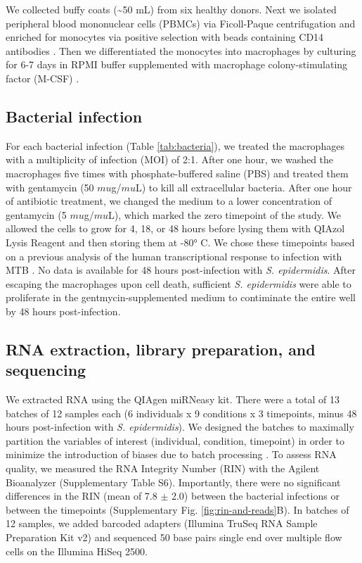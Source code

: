 We collected buffy coats (\textasciitilde{}50 mL) from six healthy
donors. Next we isolated peripheral blood mononuclear cells (PBMCs) via
Ficoll-Paque centrifugation \citep{Rivero-Lezcano2012} and enriched for
monocytes via positive selection with beads containing CD14 antibodies
\citep{Barreiro2012}. Then we differentiated the monocytes into
macrophages by culturing for 6-7 days in RPMI buffer supplemented with
macrophage colony-stimulating factor (M-CSF) \citep{Tailleux2003}.

\subsection{Bacterial infection}\label{bacterial-infection}

For each bacterial infection (Table \ref{tab:bacteria}), we treated the macrophages with
a multiplicity of infection (MOI) of 2:1. After one hour, we washed the
macrophages five times with phosphate-buffered saline (PBS) and treated
them with gentamycin (50 $mu$g/$mu$L) to kill all extracellular bacteria.
After one hour of antibiotic treatment, we changed the medium to a lower
concentration of gentamycin (5 $mu$g/$mu$L), which marked the zero timepoint
of the study. We allowed the cells to grow for 4, 18, or 48 hours before
lysing them with QIAzol Lysis Reagent and then storing them at -80° C.
We chose these timepoints based on a previous analysis of the human
transcriptional response to infection with MTB \citep{Tailleux2008}. No
data is available for 48 hours post-infection with \emph{S.
epidermidis}. After escaping the macrophages upon cell death, sufficient
\emph{S. epidermidis} were able to proliferate in the
gentmycin-supplemented medium to contiminate the entire well by 48 hours
post-infection.

\subsection{RNA extraction, library preparation, and
sequencing}\label{rna-extraction-library-preparation-and-sequencing}

We extracted RNA using the QIAgen miRNeasy kit. There were a total of 13
batches of 12 samples each (6 individuals x 9 conditions x 3 timepoints,
minus 48 hours post-infection with \emph{S. epidermidis}). We designed
the batches to maximally partition the variables of interest
(individual, condition, timepoint) in order to minimize the introduction
of biases due to batch processing \citep{Auer2010}. To assess RNA
quality, we measured the RNA Integrity Number (RIN) with the Agilent
Bioanalyzer (Supplementary Table S6). Importantly, there were no
significant differences in the RIN (mean of 7.8 $\pm$ 2.0) between the
bacterial infections or between the timepoints (Supplementary Fig. \ref{fig:rin-and-reads}B). In batches of 12 samples, we added barcoded adapters (Illumina
TruSeq RNA Sample Preparation Kit v2) and sequenced 50 base pairs single
end over multiple flow cells on the Illumina HiSeq 2500.

